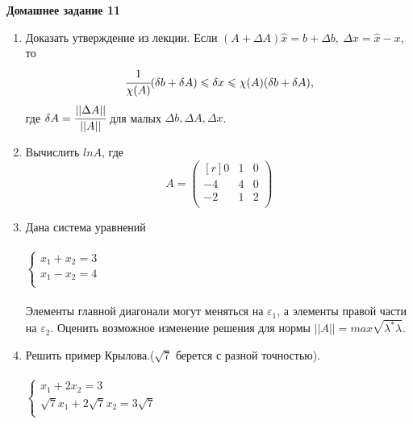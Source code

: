 \documentclass[12pt]{article}
\theoremstyle{definition}
\numberwithin{equation}{section}
\begin{document}
\textbf{Домашнее задание 11}\begin{enumerate}
\item Доказать утверждение из лекции. Если $(A+\Delta A)\hat x=b+\Delta b,~\Delta x=\hat x-x$, то 
$$\cfrac{1}{\chi(A)}(\delta b+\delta A) \leqslant \delta x \leqslant \chi(A)(\delta b+ \delta A),$$ где $\delta A=\cfrac{||\Delta A||}{||A||}$ для малых $\Delta b, \Delta A, \Delta x$.
\item Вычислить $ln A$, где 
\[A = \begin{pmatrix}[r]
0 & 1 & 0\\
-4 & 4 & 0\\
-2 & 1 & 2\\
\end{pmatrix}\]
\item Дана система уравнений\\ \\
$
\left\{
\begin{array}{lcl}
    x_1+x_2=3\\
    x_1-x_2=4\\
\end{array}
\right.
$
\\ \\
Элементы главной диагонали могут меняться на $\varepsilon_1$, а элементы правой части на $\varepsilon_2$. Оценить возможное изменение решения для нормы $||A||=max\sqrt{\lambda^*\lambda}$.
\item Решить пример Крылова.($\sqrt{7}$ берется с разной точностью).\\ \\
$
\left\{
\begin{array}{lcl}
    x_1+2x_2=3\\
    \sqrt{7}x_1+2\sqrt{7}x_2=3\sqrt{7}\\
\end{array}
\right.
$
\\ 
\end{enumerate}
~\\
\end{document}
